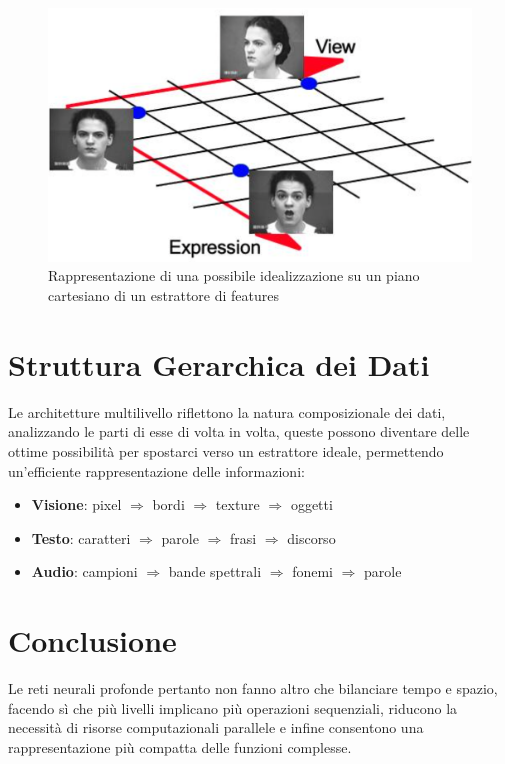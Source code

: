 \begin{figure}
    \centering
    \includegraphics[width=0.45\linewidth]{figure/cartesianFig.png}
    \caption{Rappresentazione di una possibile idealizzazione su un piano cartesiano di un estrattore di features}
    \label{fig:cartesianFig}
\end{figure}
\section{Struttura Gerarchica dei Dati}
Le architetture multilivello riflettono la natura composizionale dei dati, analizzando le parti di esse di volta in volta, queste possono diventare delle ottime possibilità per spostarci verso un estrattore ideale, permettendo un'efficiente rappresentazione delle informazioni:

\begin{itemize}
    \item \textbf{Visione}: pixel $\Rightarrow$ bordi $\Rightarrow$ texture $\Rightarrow$ oggetti
    \item \textbf{Testo}: caratteri $\Rightarrow$ parole $\Rightarrow$ frasi $\Rightarrow$ discorso
    \item \textbf{Audio}: campioni $\Rightarrow$ bande spettrali $\Rightarrow$ fonemi $\Rightarrow$ parole
\end{itemize}

\section{Conclusione}
Le reti neurali profonde pertanto non fanno altro che bilanciare tempo e spazio, facendo sì che più livelli implicano più operazioni sequenziali, riducono la necessità di risorse computazionali parallele e infine consentono una rappresentazione più compatta delle funzioni complesse.